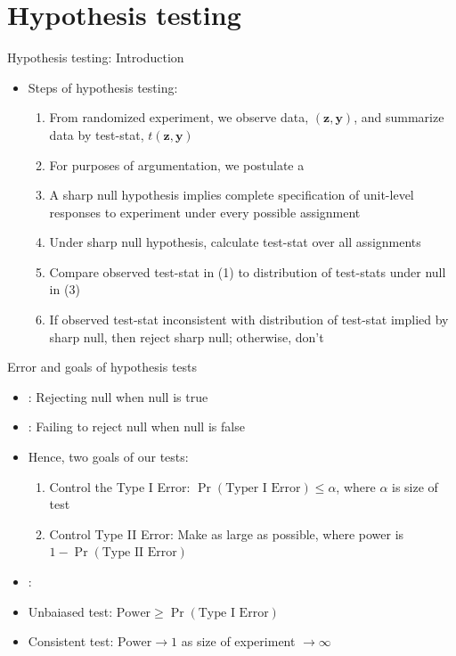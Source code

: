 \documentclass[table, xcolor = {dvipsnames}, 9pt]{beamer}
\theoremstyle{plain}
\newcommand{\mh}[1]{{\color{magenta}{#1}}}
\begin{document}
\section{Hypothesis testing}
\begin{frame}{Hypothesis testing: Introduction}
\vfill
\begin{itemize}
\item Steps of hypothesis testing: \vfill
\begin{enumerate}
\item From randomized experiment, we observe data, $(\bm{z}, \bm{y})$, and summarize data by test-stat, $t(\bm{z}, \bm{y})$
\item For purposes of argumentation, we postulate a \mh{sharp null hypothesis}
\item[] A sharp null hypothesis implies complete specification of unit-level responses to experiment under every possible assignment
\item Under sharp null hypothesis, calculate test-stat over all assignments
\item Compare observed test-stat in (1) to distribution of test-stats under null in (3)
\item If observed test-stat inconsistent with distribution of test-stat implied by sharp null, then reject sharp null; otherwise, don't
\end{enumerate}
\end{itemize} \vfill
\end{frame}
\begin{frame}{Error and goals of hypothesis tests}
\vfill
\begin{itemize}
\item \mh{Type I Error}: Rejecting null when null is true
\item \mh{Type II Error}: Failing to reject null when null is false
\item Hence, two goals of our tests:
\begin{enumerate}
\item Control the Type I Error: $\Pr\left(\text{Typer I Error}\right) \leq \alpha$, where $\alpha$ is size of test
\item Control Type II Error: Make \mh{power} as large as possible, where power is $1 - \Pr\left(\text{Type II Error}\right)$
\end{enumerate}
\item \mh{Definitions}:
\item[] Unbaiased test: $\text{Power} \geq \Pr\left(\text{Type I Error}\right)$
\item[] Consistent test: $\text{Power} \to 1$ as size of experiment $\to \infty$
\end{itemize} \vfill
\end{frame}
\end{document}
